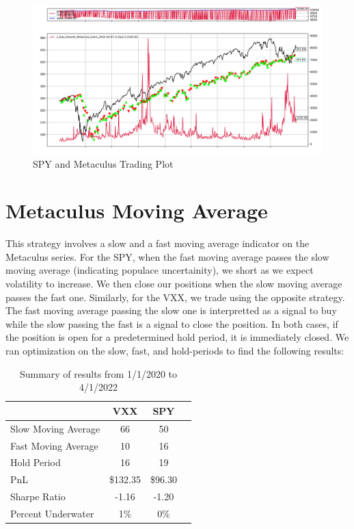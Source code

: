 \documentclass{article}
\begin{document}
\begin{figure}[H]
    \centering
    \includegraphics[width=\textwidth]{Metaculus_Momentum_SPY.png}
    \caption{SPY and Metaculus Trading Plot}
\end{figure}

\newpage

\section*{Metaculus Moving Average}
This strategy involves a slow and a fast moving average indicator on the Metaculus series. For the SPY, when the fast moving average passes the slow moving average (indicating populace uncertainity), we short as we expect volatility to increase. We then close our positions when the slow moving average passes the fast one.
Similarly, for the VXX, we trade using the opposite strategy. The fast moving average passing the slow one is interpretted as a signal to buy while the slow passing the fast is a signal to close the position. In both cases, if the position is open for a predetermined hold period, it is immediately closed. We ran optimization on the slow, fast, and hold-periods to find the following results:

\begin{table}[h]
    \centering
    
    \begin{tabular}{l||ccc}
        \toprule
         & \textbf{VXX} & \textbf{SPY} & \\
        \midrule
        Slow Moving Average & 66  & 50\\
        Fast Moving Average & 10  & 16\\
        Hold Period & 16  & 19\\
        PnL & \$132.35 & \$96.30 \\
        Sharpe Ratio & -1.16 & -1.20\\
        Percent Underwater & 1\% &  0\%\\
        \bottomrule
    \end{tabular}
    \caption{Summary of results from 1/1/2020 to 4/1/2022}
    \end{table}
\end{document}

